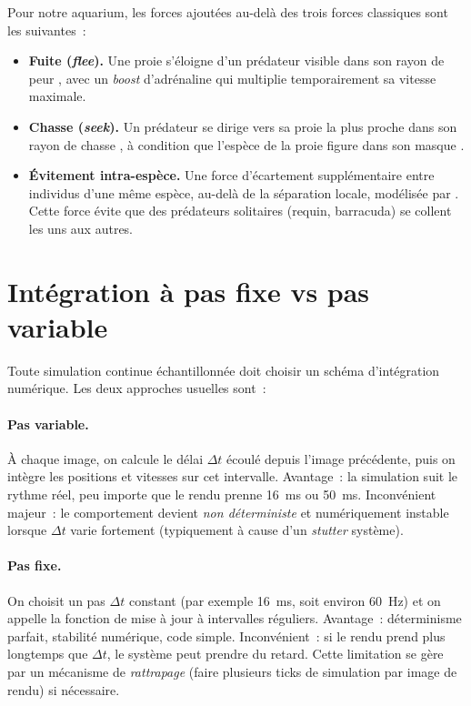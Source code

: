 Pour notre aquarium, les forces ajoutées au-delà des trois forces
classiques sont les suivantes~:

\begin{itemize}
  \item \textbf{Fuite (\emph{flee}).} Une proie s'éloigne d'un
    prédateur visible dans son rayon de peur ,
    avec un \emph{boost} d'adrénaline  qui
    multiplie temporairement sa vitesse maximale.
  \item \textbf{Chasse (\emph{seek}).} Un prédateur se dirige vers
    sa proie la plus proche dans son rayon de chasse
    , à condition que l'espèce de la proie
    figure dans son masque .
  \item \textbf{Évitement intra-espèce.} Une force d'écartement
    supplémentaire entre individus d'une même espèce, au-delà de
    la séparation locale, modélisée par .
    Cette force évite que des prédateurs solitaires (requin,
    barracuda) se collent les uns aux autres.
\end{itemize}

\section{Intégration à pas fixe vs pas variable}

Toute simulation continue échantillonnée doit choisir un schéma
d'intégration numérique. Les deux approches usuelles sont~:

\paragraph{Pas variable.} À chaque image, on calcule le délai
$\Delta t$ écoulé depuis l'image précédente, puis on intègre les
positions et vitesses sur cet intervalle. Avantage~: la simulation
suit le rythme réel, peu importe que le rendu prenne 16~ms ou
50~ms. Inconvénient majeur~: le comportement devient \emph{non
déterministe} et numériquement instable lorsque $\Delta t$ varie
fortement (typiquement à cause d'un \emph{stutter} système).

\paragraph{Pas fixe.} On choisit un pas $\Delta t$ constant (par
exemple 16~ms, soit environ 60~Hz) et on appelle la fonction de
mise à jour à intervalles réguliers. Avantage~: déterminisme
parfait, stabilité numérique, code simple. Inconvénient~: si le
rendu prend plus longtemps que $\Delta t$, le système peut
prendre du retard. Cette limitation se gère par un mécanisme de
\emph{rattrapage} (faire plusieurs ticks de simulation par image
de rendu) si nécessaire.

